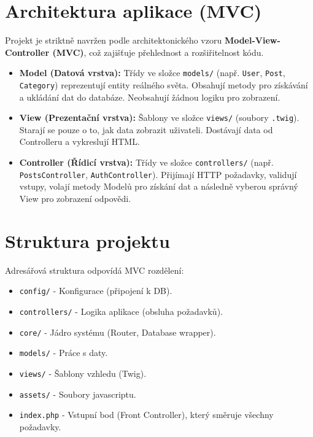 \documentclass[12pt,a4paper]{article}
\begin{document}

\section{Architektura aplikace (MVC)}
Projekt je striktně navržen podle architektonického vzoru \textbf{Model-View-Controller (MVC)}, což zajišťuje přehlednost a rozšiřitelnost kódu.

\begin{itemize}
    \item \textbf{Model (Datová vrstva):} Třídy ve složce \texttt{models/} (např. \texttt{User}, \texttt{Post}, \texttt{Category}) reprezentují entity reálného světa. Obsahují metody pro získávání a ukládání dat do databáze. Neobsahují žádnou logiku pro zobrazení.
    \item \textbf{View (Prezentační vrstva):} Šablony ve složce \texttt{views/} (soubory \texttt{.twig}). Starají se pouze o to, jak data zobrazit uživateli. Dostávají data od Controlleru a vykreslují HTML.
    \item \textbf{Controller (Řídicí vrstva):} Třídy ve složce \texttt{controllers/} (např. \texttt{PostsController}, \texttt{AuthController}). Přijímají HTTP požadavky, validují vstupy, volají metody Modelů pro získání dat a následně vyberou správný View pro zobrazení odpovědi.
\end{itemize}

\section{Struktura projektu}
Adresářová struktura odpovídá MVC rozdělení:

\begin{itemize}
    \item \texttt{config/} - Konfigurace (připojení k DB).
    \item \texttt{controllers/} - Logika aplikace (obsluha požadavků).
    \item \texttt{core/} - Jádro systému (Router, Database wrapper).
    \item \texttt{models/} - Práce s daty.
    \item \texttt{views/} - Šablony vzhledu (Twig).
    \item \texttt{assets/} - Soubory javascriptu.
    \item \texttt{index.php} - Vstupní bod (Front Controller), který směruje všechny požadavky.
\end{itemize}
\end{document}
